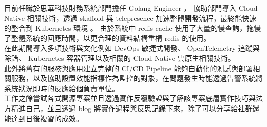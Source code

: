 %
%
\par{
目前任職於思華科技財務系統部門擔任 Golang Engineer ， 協助部門導入 Cloud  Native 相關技術，透過 skaffold 與 telepresence 加速整體開發流程，最終能快速的整合到  Kubernetes 環境 。
由於系統中 redis cache 使用了大量的慢查詢，拖慢了整體系統的回應時間，以更合理的資料結構重構 redis 的使用。\\
在此期間導入多項技術與文化例如 DevOps 敏捷式開發、 OpenTelemetry 追蹤與除錯、 Kubernetes 容器管理以及相關的 Cloud Native 雲原生相關技術。\\
此外將舊有的服務與應用建立完整的 CI/CD Pipeline 能夠自動化的測試與部署相關服務，以及協助設置效能指標作為監控的對象，在問題發生時能透過告警系統將系統狀況即時的反應給個負責單位。\\
工作之餘嘗試各式開源專案並且透過實作反覆驗證與了解該專案底層實作技巧與法方精進自己，並且透過 blog 將實作過程與反思記錄下來，除了可以分享給社群還能達到日後複習的成效。
}